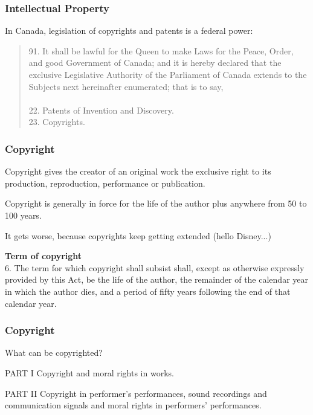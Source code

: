 \begin{frame}
\frametitle{Intellectual Property}

In Canada, legislation of copyrights and patents is a federal power:

\begin{quote}
91. It shall be lawful for the Queen to make Laws for the Peace, Order, and good Government of Canada; and it is hereby declared that the exclusive Legislative Authority of the Parliament of Canada extends to the Subjects next hereinafter enumerated; that is to say,
\\~\\

22. Patents of Invention and Discovery.\\
23.	Copyrights.
\end{quote}

\end{frame}



\begin{frame}
\frametitle{Copyright}

Copyright gives the creator of an original work the exclusive right to its production, reproduction, performance or publication.

Copyright is generally in force for the life of the author plus anywhere from 50 to 100 years.

It gets worse, because copyrights keep getting extended (hello Disney...)


\textbf{Term of copyright}\\

6. The term for which copyright shall subsist shall, except as otherwise expressly provided by this Act, be the life of the author, the remainder of the calendar year in which the author dies, and a period of fifty years following the end of that calendar year.

\end{frame}



\begin{frame}
\frametitle{Copyright}

What can be copyrighted?


	PART I	Copyright and moral rights in works.


	PART II	Copyright in performer's performances, sound recordings and communication signals and moral rights in performers' performances.


\end{frame}



